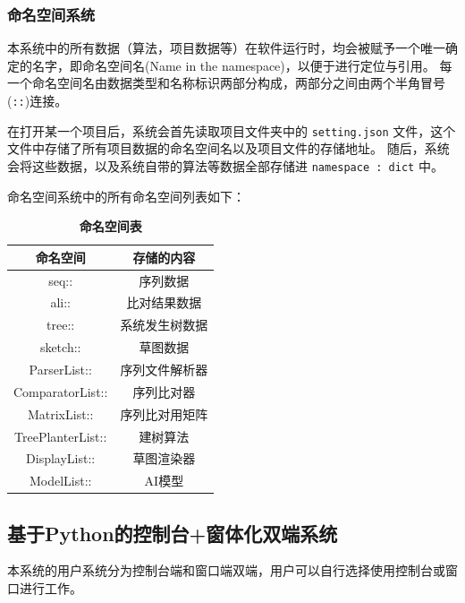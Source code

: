 \documentclass{article}
\begin{document}
\begin{multicols}{2}
\subsubsection{命名空间系统}
\par
本系统中的所有数据（算法，项目数据等）在软件运行时，均会被赋予一个唯一确定的名字，即命名空间名(Name in the namespace)，以便于进行定位与引用。
每一个命名空间名由数据类型和名称标识两部分构成，两部分之间由两个半角冒号(\verb|::|)连接。
\par
在打开某一个项目后，系统会首先读取项目文件夹中的 \verb|setting.json| 文件，这个文件中存储了所有项目数据的命名空间名以及项目文件的存储地址。
随后，系统会将这些数据，以及系统自带的算法等数据全部存储进 \verb|namespace : dict| 中。
\par
命名空间系统中的所有命名空间列表如下：
\par
\begin{table}[H]
\caption{\textbf{命名空间表}}
\centering
\begin{tabular}{cc}
\toprule
命名空间&存储的内容\\
\midrule
seq::&序列数据\\
ali::&比对结果数据\\
tree::&系统发生树数据\\
sketch::&草图数据\\
ParserList::&序列文件解析器\\
ComparatorList::&序列比对器\\
MatrixList::&序列比对用矩阵\\
TreePlanterList::&建树算法\\
DisplayList::&草图渲染器\\
ModelList::&AI模型\\
\bottomrule
\end{tabular}
\end{table}
% 

\subsection{基于Python的控制台+窗体化双端系统}
\par
本系统的用户系统分为控制台端和窗口端双端，用户可以自行选择使用控制台或窗口进行工作。

\end{multicols}
\end{document}
